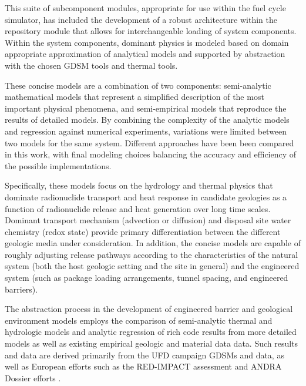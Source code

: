 This suite of subcomponent modules, appropriate for use within the \Cyclus fuel 
cycle simulator, has included the development of a robust architecture 
within the repository module that allows for interchangeable loading of 
system components.  Within the system components, dominant physics is 
modeled based on domain appropriate approximation of analytical models and 
supported by abstraction with the chosen \gls{GDSM} tools and thermal tools. 


These concise models are a combination of two components: 
semi-analytic mathematical models that represent a simplified description of 
the most important physical phenomena, and semi-empirical models that reproduce 
the results of detailed models.  By combining the complexity of the analytic 
models and regression against numerical experiments, variations were limited 
between two models for the same system.  Different approaches have been been 
compared in this work, with final modeling choices balancing the accuracy and 
efficiency of the possible implementations.  


Specifically, these models focus on the hydrology and thermal 
physics that dominate radionuclide transport and heat response in candidate 
geologies as a function of radionuclide release and heat generation over long 
time scales. Dominant transport mechanism (advection or 
diffusion) and disposal site water chemistry (redox state) provide primary 
differentiation between the different geologic media under consideration. In 
addition, the concise models are capable of roughly adjusting release 
pathways according to the characteristics of the natural system (both the host 
geologic setting and the site in general) and the engineered system (such as package 
loading arrangements, tunnel spacing, and engineered barriers).


The abstraction process in the development of engineered barrier and  geological 
environment models employs the comparison of semi-analytic thermal and 
hydrologic models and analytic regression of rich code results from more 
detailed models as well as existing empirical geologic and material data data. 
Such results and data are derived primarily from the \gls{UFD} campaign 
\glspl{GDSM} and data, as well as European efforts such as the RED-IMPACT 
assessment and \gls{ANDRA} Dossier efforts \cite{von_lensa_red-impact_2008, 
andra_argile:_2005, clayton_generic_2011} . 


